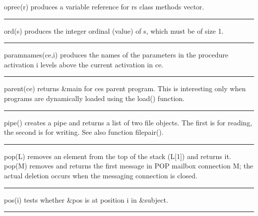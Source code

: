 \noindent
\textsf{oprec(r)} produces a variable reference for
\textsf{r}{\textquotesingle}s class{\textquotesingle} methods vector.

\bigskip\hrule\vspace{0.1cm}

\noindent
{}\textsf{ord(s)} produces the integer ordinal
(value) of \textsf{s}, which must be of size 1.

\bigskip\hrule\vspace{0.1cm}

\noindent
{}\textsf{paramnames(ce,i)} produces the names of
the parameters in the procedure activation \textsf{i} levels above the
current activation in \textsf{ce}.

\bigskip\hrule\vspace{0.1cm}

\noindent
\textsf{parent(ce)} returns \textsf{\&main} for ce{\textquotesingle}s
parent program. This is interesting only when programs are dynamically
loaded using the \textsf{load()} function.

\bigskip\hrule\vspace{0.1cm}

\noindent
{}\textsf{pipe()} creates a pipe and returns a list of two
file objects. The first is for reading, the second is for writing. See
also function \textsf{filepair()}.

\bigskip\hrule\vspace{0.1cm}

\noindent
{}\textsf{pop(L)} removes an element from the top of the
stack (\textsf{L[1]}) and returns it. \textsf{pop(M)}
removes and returns the first message in POP mailbox connection M; the
actual deletion occurs when the messaging connection is closed.

\bigskip\hrule\vspace{0.1cm}

\noindent
{}\textsf{pos(i)} tests whether \textsf{\&pos} is at
position \textsf{i} in \textsf{\&subject}.

\bigskip\hrule\vspace{0.1cm}


